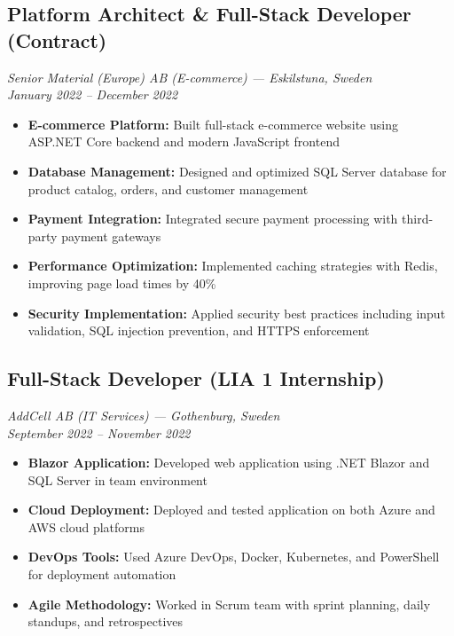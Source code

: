 \documentclass[10pt,a4paper]{article}
\begin{document}
\subsection*{Platform Architect \& Full-Stack Developer (Contract)}
\textit{Senior Material (Europe) AB (E-commerce) — Eskilstuna, Sweden}\\
\textit{January 2022 -- December 2022}

\begin{itemize}[noitemsep,leftmargin=*]
\item \textbf{E-commerce Platform:} Built full-stack e-commerce website using ASP.NET Core backend and modern JavaScript frontend
\item \textbf{Database Management:} Designed and optimized SQL Server database for product catalog, orders, and customer management
\item \textbf{Payment Integration:} Integrated secure payment processing with third-party payment gateways
\item \textbf{Performance Optimization:} Implemented caching strategies with Redis, improving page load times by 40\%
\item \textbf{Security Implementation:} Applied security best practices including input validation, SQL injection prevention, and HTTPS enforcement
\end{itemize}

\subsection*{Full-Stack Developer (LIA 1 Internship)}
\textit{AddCell AB (IT Services) — Gothenburg, Sweden}\\
\textit{September 2022 -- November 2022}

\begin{itemize}[noitemsep,leftmargin=*]
\item \textbf{Blazor Application:} Developed web application using .NET Blazor and SQL Server in team environment
\item \textbf{Cloud Deployment:} Deployed and tested application on both Azure and AWS cloud platforms
\item \textbf{DevOps Tools:} Used Azure DevOps, Docker, Kubernetes, and PowerShell for deployment automation
\item \textbf{Agile Methodology:} Worked in Scrum team with sprint planning, daily standups, and retrospectives
\end{itemize}

\vspace{0.2cm}
\end{document}

